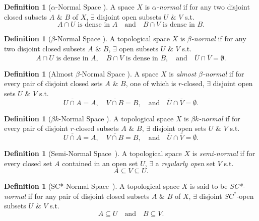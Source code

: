 \documentclass[12pt,a4paper,twoside]{report}  %
\theoremstyle{plain}
\theoremstyle{definition}
\newtheorem{definition}[theorem]{Definition}
\begin{document}
\begin{definition}[$\alpha$-Normal Space \cite{arhangelskii2001alpha}]
A space $X$ is \emph{$\alpha$-normal} if for any two disjoint closed subsets $A$ $\&$ $B$ of $X$,  $\exists$ disjoint open subsets $U$ $\&$ $V$ s.t.
\[
A \cap U \text{ is dense in } A \quad \text{and} \quad B \cap V \text{ is dense in } B.
\]
\end{definition}

\begin{definition}[$\beta$-Normal Space \cite{arhangelskii2001alpha}]
A topological space $X$ is \emph{$\beta$-normal} if for any two disjoint closed subsets $A$ $\&$ $B$, $\exists$ open subsets $U$ $\&$ $V$ s.t.
\[
A \cap U \text{ is dense in } A, \quad B \cap V \text{ is dense in } B, \quad \text{and} \quad \overline{U} \cap \overline{V} = \emptyset.
\]
\end{definition}

\begin{definition}[Almost $\beta$-Normal Space \cite{das2017simultaneous}]
A space $X$ is \emph{almost $\beta$-normal} if for every pair of disjoint closed sets $A$ $\&$ $B$, one of which is $r$-closed, $\exists$ disjoint open sets $U$ $\&$ $V$ s.t.
\[
\overline{U \cap A} = A, \quad \overline{V \cap B} = B, \quad \text{and} \quad \overline{U} \cap \overline{V} = \emptyset.
\]
\end{definition}

\begin{definition}[$\beta k$-Normal Space \cite{singh2023knormal}]
A topological space $X$ is \emph{$\beta k$-normal} if for every pair of disjoint $r$-closed subsets $A$ $\&$ $B$, $\exists$ disjoint open sets $U$ $\&$ $V$ s.t.
\[
\overline{U \cap A} = A, \quad \overline{V \cap B} = B, \quad \text{and} \quad \overline{U} \cap \overline{V} = \emptyset.
\]
\end{definition}

\begin{definition}[Semi-Normal Space~\cite{levine1970gen}]\label{semi normal spaces}
A topological space $X$ is \emph{semi-normal} if for every closed set $A$ contained in an open set $U$, $\exists$ a \emph{regularly open} set $V$ s.t.
\[
A \subseteq V \subseteq U.
\]
\end{definition}

\begin{definition}[SC*-Normal Space~\cite{tomar2025sc}]
A topological space $X$ is said to be \emph{SC*-normal} if for any pair of disjoint closed subsets $A$ $\&$ $B$ of $X$, $\exists$ disjoint $SC^*$-open\cite{tomar2025sc} subsets $U$ $\&$ $V$ s.t.
\[
A \subseteq U \quad \text{and} \quad B \subseteq V.
\]
\end{definition}
\end{document}
